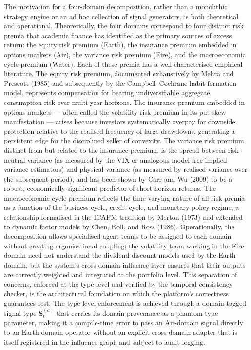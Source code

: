 \documentclass[12pt,openany]{book}
\numberwithin{equation}{chapter}
\theoremstyle{plain}
\theoremstyle{definition}
\theoremstyle{remark}
\begin{document}
The motivation for a four-domain decomposition, rather than a monolithic strategy engine or an ad hoc collection of signal generators, is both theoretical and operational. Theoretically, the four domains correspond to four distinct risk premia that academic finance has identified as the primary sources of excess return: the equity risk premium (Earth), the insurance premium embedded in options markets (Air), the variance risk premium (Fire), and the macroeconomic cycle premium (Water). Each of these premia has a well-characterised empirical literature. The equity risk premium, documented exhaustively by Mehra and Prescott (1985) and subsequently by the Campbell--Cochrane habit-formation model, represents compensation for bearing undiversifiable aggregate consumption risk over multi-year horizons. The insurance premium embedded in options markets — often called the volatility risk premium in its put-skew manifestation — arises because investors systematically overpay for downside protection relative to the realised frequency of large drawdowns, generating a persistent edge for the disciplined seller of convexity. The variance risk premium, distinct from but related to the insurance premium, is the spread between risk-neutral variance (as measured by the VIX or analogous model-free implied variance estimators) and physical variance (as measured by realised variance over the subsequent period), and has been shown by Carr and Wu (2009) to be a robust, economically significant predictor of short-horizon returns. The macroeconomic cycle premium reflects the time-varying nature of all risk premia as a function of the business cycle, credit cycle, and monetary policy regime, a relationship formalised in the ICAPM tradition by Merton (1973) and extended to dynamic factor models by Chen, Roll, and Ross (1986). Operationally, the decomposition allows specialised agent teams to be assigned to each domain without creating organisational coupling: the volatility team working in the Fire domain need not understand the dividend discount models used by the Earth domain, but the system's cross-domain influence layer ensures that their outputs are correctly weighted and integrated at the portfolio level. This separation of concerns, enforced at the type level and verified by the temporal consistency checker, is the architectural foundation on which the platform's correctness guarantees rest. The type-level enforcement is achieved through a domain-tagged signal type $\mathbf{S}^{(d)}_t$ that carries its domain provenance as a phantom type parameter, making it a compile-time error to pass an Air-domain signal directly to an Earth-domain operator without an explicit cross-domain adapter that is itself registered in the influence graph and subject to audit logging.
\end{document}
